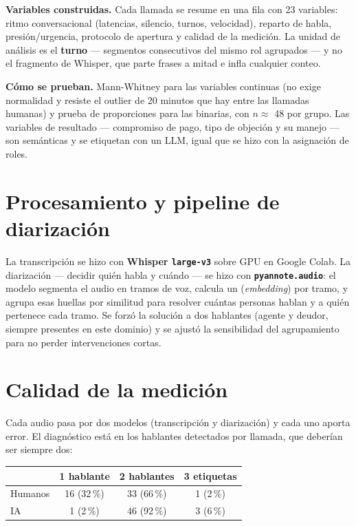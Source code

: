 \documentclass[10pt,a4paper]{article}
\begin{document}
\textbf{Variables construidas.} Cada llamada se resume en una fila con 23 variables: ritmo
conversacional (latencias, silencio, turnos, velocidad), reparto de habla, presión/urgencia,
protocolo de apertura y calidad de la medición. La unidad de análisis es el \textbf{turno} ---
segmentos consecutivos del mismo rol agrupados --- y no el fragmento de Whisper, que parte
frases a mitad e infla cualquier conteo.

\textbf{Cómo se prueban.} Mann-Whitney para las variables continuas (no exige normalidad y
resiste el outlier de 20 minutos que hay entre las llamadas humanas) y prueba de proporciones
para las binarias, con $n\approx$ 48 por grupo. Las variables de resultado --- compromiso de
pago, tipo de objeción y su manejo --- son semánticas y se etiquetan con un LLM, igual que se
hizo con la asignación de roles.

\section{Procesamiento y pipeline de diarización}

La transcripción se hizo con \textbf{Whisper \texttt{large-v3}}  sobre GPU en Google Colab. La diarización --- decidir quién habla y
cuándo --- se hizo con \textbf{\texttt{pyannote.audio}}: el modelo segmenta el audio en
tramos de voz, calcula un (\textit{embedding}) por tramo, y agrupa esas
huellas por similitud para resolver cuántas personas hablan y a quién pertenece cada tramo.
Se forzó la solución a dos hablantes (agente y deudor, siempre presentes en este dominio) y
se ajustó la sensibilidad del agrupamiento para no perder intervenciones cortas.

\section{Calidad de la medición}

Cada audio pasa por dos modelos
(transcripción y diarización) y cada uno aporta error. El diagnóstico está en los hablantes
detectados por llamada, que deberían ser siempre dos:

\begin{table}[h]
\centering\small
\vspace{-4pt}
\begin{tabular}{lccc}
\toprule
& 1 hablante & 2 hablantes & 3 etiquetas \\
\midrule
Humanos & 16 (32\,\%) & 33 (66\,\%) & 1 (2\,\%) \\
IA      & 1 (2\,\%)            & 46 (92\,\%) & 3 (6\,\%) \\
\bottomrule
\end{tabular}
\end{table}
\vspace{-12pt}
\end{document}
